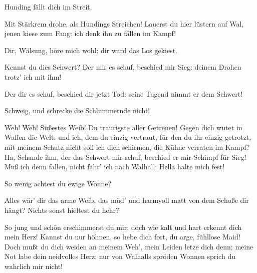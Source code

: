 \begin{drama}
\Brunnhildespeaks
Hunding fällt dich im Streit.
 

\Siegmundspeaks
Mit Stärkrem drohe,
als Hundings Streichen!
Lauerst du hier lüstern auf Wal,
jenen kiese zum Fang:
ich denk ihn zu fällen im Kampf!
 

\Brunnhildespeaks


Dir, Wälsung, höre mich wohl:
dir ward das Los gekiest.
 

\Siegmundspeaks
Kennst du dies Schwert?
Der mir es schuf, beschied mir Sieg:
deinem Drohen trotz' ich mit ihm!
 

\Brunnhildespeaks


Der dir es schuf, beschied dir jetzt Tod:
seine Tugend nimmt er dem Schwert!
 

\Siegmundspeaks


Schweig, und schrecke die Schlummernde nicht!
 



Weh! Weh! Süßestes Weib!
Du traurigste aller Getreuen!
Gegen dich wütet in Waffen die Welt:
und ich, dem du einzig vertraut,
für den du ihr einzig getrotzt,
mit meinem Schutz nicht soll ich dich schirmen,
die Kühne verraten im Kampf?
Ha, Schande ihm, der das Schwert mir schuf,
beschied er mir Schimpf für Sieg!
Muß ich denn fallen, nicht fahr' ich nach Walhall:
Hella halte mich fest!
 




\Brunnhildespeaks


So wenig achtest du ewige Wonne?
 



Alles wär' dir das arme Weib,
das müd' und harmvoll matt von dem Schoße dir hängt?
Nichts sonst hieltest du hehr?
 

\Siegmundspeaks


So jung und schön erschimmerst du mir:
doch wie kalt und hart erkennt dich mein Herz!
Kannst du nur höhnen, so hebe dich fort,
du arge, fühllose Maid!
Doch mußt du dich weiden an meinem Weh',
mein Leiden letze dich denn;
meine Not labe dein neidvolles Herz:
nur von Walhalls spröden Wonnen
sprich du wahrlich mir nicht!
 


\end{drama}
